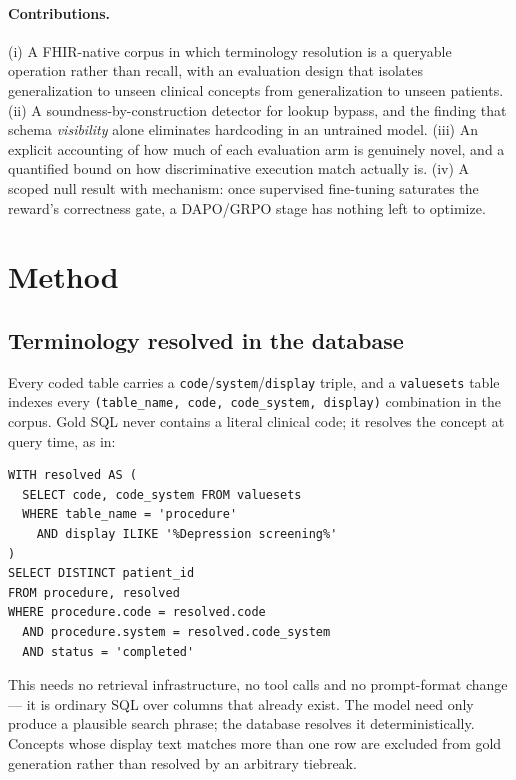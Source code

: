 \documentclass[pmlr,twocolumn,10pt]{jmlr} %
\begin{document}
\paragraph{Contributions.}
(i) A FHIR-native corpus in which terminology resolution is a queryable
operation rather than recall, with an evaluation design that isolates
generalization to unseen clinical concepts from generalization to unseen
patients. (ii) A soundness-by-construction detector for lookup bypass, and the
finding that schema \emph{visibility} alone eliminates hardcoding in an
untrained model. (iii) An explicit accounting of how much of each evaluation arm
is genuinely novel, and a quantified bound on how discriminative execution match
actually is. (iv) A scoped null result with mechanism: once supervised
fine-tuning saturates the reward's correctness gate, a DAPO/GRPO stage
\citep{yu2025dapo,shao2024deepseekmath} has nothing left to optimize.

\section{Method}

\subsection{Terminology resolved in the database}

Every coded table carries a \texttt{code}/\texttt{system}/\texttt{display}
triple, and a \texttt{valuesets} table indexes every
\texttt{(table\_name, code, code\_system, display)} combination in the corpus.
Gold SQL never contains a literal clinical code; it resolves the concept at query
time, as in:

\begin{small}
\begin{verbatim}
WITH resolved AS (
  SELECT code, code_system FROM valuesets
  WHERE table_name = 'procedure'
    AND display ILIKE '%Depression screening%'
)
SELECT DISTINCT patient_id
FROM procedure, resolved
WHERE procedure.code = resolved.code
  AND procedure.system = resolved.code_system
  AND status = 'completed'
\end{verbatim}
\end{small}

This needs no retrieval infrastructure, no tool calls and no prompt-format
change --- it is ordinary SQL over columns that already exist. The model need
only produce a plausible search phrase; the database resolves it
deterministically. Concepts whose display text matches more than one row are
excluded from gold generation rather than resolved by an arbitrary tiebreak.
\end{document}
